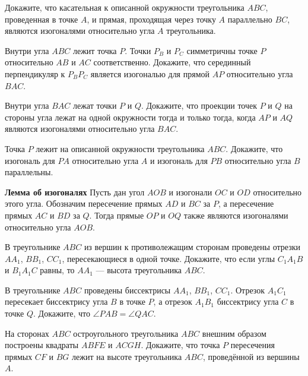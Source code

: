 \documentclass{article}
\begin{document}
    \begin{enumerate_boxed}

        \item Докажите, что касательная к описанной окружности треугольника $ABC$, проведенная в точке $A$, и прямая, проходящая через точку $A$ параллельно $BC$, являются изогоналями относительно угла $A$ треугольника.

        \item Внутри угла $ABC$ лежит точка $P$.
        Точки $P_B$ и $P_C$ симметричны точке $P$ относительно $AB$ и $AC$ соответственно.
        Докажите, что серединный перпендикуляр к $P_B P_C$ является изогональю для прямой $AP$ относительно угла $BAC$.

        \item Внутри угла $BAC$ лежат точки $P$ и $Q$.
        Докажите, что проекции точек $P$ и $Q$ на стороны угла лежат на одной окружности тогда и только тогда, когда $AP$ и $AQ$ являются изогоналями относительно угла $BAC$.

        \item Точка $P$ лежит на описанной окружности треугольника $ABC$.
        Докажите, что изогональ для $PA$ относительно угла $A$ и изогональ для $PB$ относительно угла $B$ параллельны.

        \item \textbf{Лемма об изогоналях} Пусть дан угол $AOB$ и изогонали $OC$ и $OD$ относительно этого угла.
        Обозначим пересечение прямых $AD$ и $BC$ за $P$, а пересечение прямых $AC$ и $BD$ за $Q$.
        Тогда прямые $OP$ и $OQ$ также являются изогоналями относительно угла $AOB$.

        \item В треугольнике $ABC$ из вершин к противолежащим сторонам проведены отрезки $AA_1$, $BB_1$, $CC_1$, пересекающиеся в одной точке.
        Докажите, что если углы $C_{1}A_{1}B$ и $B_{1}A_{1}C$ равны, то $AA_1$ — высота треугольника $ABC$.

        \item В треугольнике $ABC$ проведены биссектрисы $AA_1$, $BB_1$, $CC_1$.
        Отрезок $A_{1}C_1$ пересекает биссектрису угла $B$ в точке $P$, а отрезок $A_{1}B_1$ биссектрису угла $C$ в точке $Q$.
        Докажите, что $\angle PAB = \angle QAC$.

        \item На сторонах $ABC$ остроугольного треугольника $ABC$ внешним образом построены квадраты $ABFE$ и $ACGH$.
        Докажите, что точка $P$ пересечения прямых $CF$ и $BG$ лежит на высоте треугольника $ABC$, проведённой из вершины $A$.


\end{enumerate_boxed}
\end{document}
